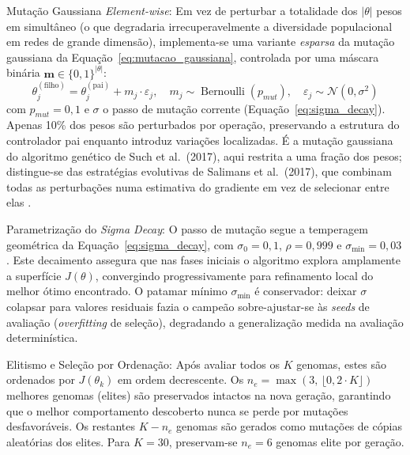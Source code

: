 \documentclass[12pt,reqno, twoside]{amsbook}
\makeatletter
\def\paragraph{\@startsection{paragraph}{4}%
  \z@\z@{-\fontdimen2\font}%
  {\normalfont\bfseries}}
\theoremstyle{plain}
\numberwithin{equation}{chapter}
\numberwithin{section}{chapter}
\numberwithin{table}{chapter}
\numberwithin{figure}{chapter}
\makeatother
\begin{document}
\paragraph{Mutação Gaussiana \textit{Element-wise}:}
Em vez de perturbar a totalidade dos $|\theta|$ pesos em simultâneo (o que degradaria irrecuperavelmente a diversidade populacional em redes de grande dimensão), implementa-se uma variante \emph{esparsa} da mutação gaussiana da Equação~\ref{eq:mutacao_gaussiana}, controlada por uma máscara binária $\mathbf{m} \in \{0,1\}^{|\theta|}$:
\begin{equation}
    \theta_j^{(\text{filho})} = \theta_j^{(\text{pai})} + m_j \cdot \varepsilon_j, \quad m_j \sim \operatorname{Bernoulli}(p_{mut}), \quad \varepsilon_j \sim \mathcal{N}(0, \sigma^2)
    \label{eq:mutation}
\end{equation}
com $p_{mut} = 0{,}1$ e $\sigma$ o passo de mutação corrente (Equação~\ref{eq:sigma_decay}). Apenas 10\% dos pesos são perturbados por operação, preservando a estrutura do controlador pai enquanto introduz variações localizadas. É a mutação gaussiana do algoritmo genético de Such et al.\ (2017), aqui restrita a uma fração dos pesos; distingue-se das estratégias evolutivas de Salimans et al.\ (2017), que combinam todas as perturbações numa estimativa do gradiente em vez de selecionar entre elas \cite{such2017deep, salimans2017es}.

\paragraph{Parametrização do \textit{Sigma Decay}:}
O passo de mutação segue a temperagem geométrica da Equação~\ref{eq:sigma_decay}, com $\sigma_0 = 0{,}1$, $\rho = 0{,}999$ e $\sigma_{\min} = 0{,}03$. Este decaimento assegura que nas fases iniciais o algoritmo explora amplamente a superfície $J(\theta)$, convergindo progressivamente para refinamento local do melhor ótimo encontrado. O patamar mínimo $\sigma_{\min}$ é conservador: deixar $\sigma$ colapsar para valores residuais fazia o campeão sobre-ajustar-se às \textit{seeds} de avaliação (\textit{overfitting} de seleção), degradando a generalização medida na avaliação determinística.

\paragraph{Elitismo e Seleção por Ordenação:}
Após avaliar todos os $K$ genomas, estes são ordenados por $J(\theta_k)$ em ordem decrescente. Os $n_e = \max\!\left(3,\, \lfloor 0{,}2 \cdot K \rfloor\right)$ melhores genomas (elites) são preservados intactos na nova geração, garantindo que o melhor comportamento descoberto nunca se perde por mutações desfavoráveis. Os restantes $K - n_e$ genomas são gerados como mutações de cópias aleatórias dos elites. Para $K=30$, preservam-se $n_e=6$ genomas elite por geração.
\end{document}
